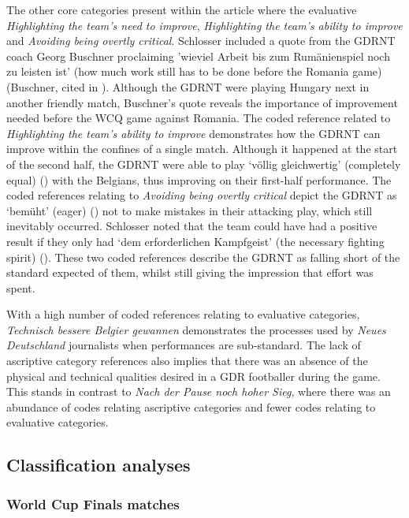 The other core categories present within the article where the evaluative \textit{Highlighting the team’s need to improve}, \textit{Highlighting the team’s ability to improve} and \textit{Avoiding being overtly critical}. Schlosser included a quote from the GDRNT coach Georg Buschner proclaiming 'wieviel Arbeit bis zum Rumänienspiel noch zu leisten ist' (how much work still has to be done before the Romania game) (Buschner, cited in \cite{nd19730419}). Although the GDRNT were playing Hungary next in another friendly match, Buschner’s quote reveals the importance of improvement needed before the WCQ game against Romania. The coded reference related to \textit{Highlighting the team’s ability to improve} demonstrates how the GDRNT can improve within the confines of a single match. Although it happened at the start of the second half, the GDRNT were able to play ‘völlig gleichwertig’ (completely equal) (\cite{nd19730419}) with the Belgians, thus improving on their first-half performance. The coded references relating to \textit{Avoiding being overtly critical} depict the GDRNT as ‘bemüht’ (eager) (\cite{nd19730419}) not to make mistakes in their attacking play, which still inevitably occurred. Schlosser noted that the team could have had a positive result if they only had ‘dem erforderlichen Kampfgeist’ (the necessary fighting spirit) (\cite{nd19730419}). These two coded references describe the GDRNT as falling short of the standard expected of them, whilst still giving the impression that effort was spent.

With a high number of coded references relating to evaluative categories, \textit{Technisch bessere Belgier gewannen} demonstrates the processes used by \textit{Neues Deutschland} journalists when performances are sub-standard. The lack of ascriptive category references also implies that there was an absence of the physical and technical qualities desired in a GDR footballer during the game. This stands in contrast to \textit{Nach der Pause noch hoher Sieg}, where there was an abundance of codes relating ascriptive categories and fewer codes relating to evaluative categories.

\subsection*{Classification analyses}

\subsubsection*{World Cup Finals matches}

